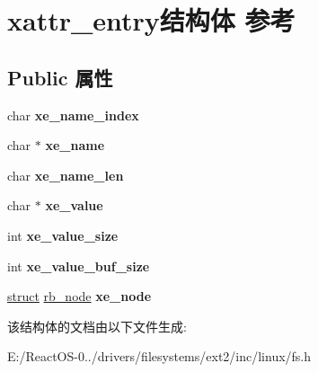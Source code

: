 \hypertarget{structxattr__entry}{}\section{xattr\+\_\+entry结构体 参考}
\label{structxattr__entry}
\subsection*{Public 属性}
\begin{DoxyCompactItemize}
\item 
\mbox{\label{structxattr__entry_a7771b8aee901ba3e34cfc8aa9e5cee87}} 
char {\bfseries xe\+\_\+name\+\_\+index}
\item 
\mbox{\label{structxattr__entry_ad05271b942139e6bc833852f85881add}} 
char $\ast$ {\bfseries xe\+\_\+name}
\item 
\mbox{\label{structxattr__entry_ab88fc27e350ee52fa949c9b0c69c5973}} 
char {\bfseries xe\+\_\+name\+\_\+len}
\item 
\mbox{\label{structxattr__entry_a56f4bd2311f102f4e8387d783f92ff87}} 
char $\ast$ {\bfseries xe\+\_\+value}
\item 
\mbox{\label{structxattr__entry_a8073d4393fbced2fe39466c0291b592d}} 
int {\bfseries xe\+\_\+value\+\_\+size}
\item 
\mbox{\label{structxattr__entry_a1e32bad3f42230cda8a55f5c17fc525e}} 
int {\bfseries xe\+\_\+value\+\_\+buf\+\_\+size}
\item 
\mbox{\label{structxattr__entry_a2184977069fc720f143ac7be10871fc1}} 
\hyperlink{interfacestruct}{struct} \hyperlink{structrb__node}{rb\+\_\+node} {\bfseries xe\+\_\+node}
\end{DoxyCompactItemize}


该结构体的文档由以下文件生成\+:\begin{DoxyCompactItemize}
\item 
E\+:/\+React\+O\+S-\/0../drivers/filesystems/ext2/inc/linux/fs.\+h\end{DoxyCompactItemize}
